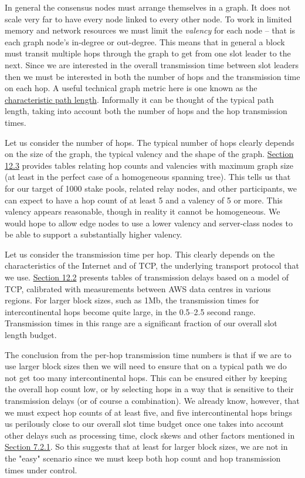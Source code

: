 \documentclass[11pt,a4paper]{article}
\begin{document}
In general the consensus nodes must arrange themselves in a graph. It
does not scale very far to have every node linked to every other node.
To work in limited memory and network resources we must limit the
\emph{valency} for each node -- that is each graph node's in-degree or
out-degree. This means that in general a block must transit multiple
hops through the graph to get from one slot leader to the next. Since we
are interested in the overall transmission time between slot leaders
then we must be interested in both the number of hops and the
transmission time on each hop. A useful technical graph metric here is
one known as the \protect\hyperlink{rm0n4bczhl67}{{characteristic path
length}}. Informally it can be thought of the typical path length,
taking into account both the number of hops and the hop transmission
times.

Let us consider the number of hops. The typical number of hops clearly
depends on the size of the graph, the typical valency and the shape of
the graph. \protect\hyperlink{model-of-network-scaling}{Section 12.3}
provides tables relating hop counts and valencies with maximum graph
size (at least in the perfect case of a homogeneous spanning tree). This
tells us that for our target of 1000 stake pools, related relay nodes,
and other participants, we can expect to have a hop count of at least 5
and a valency of 5 or more. This valency appears reasonable, though in
reality it cannot be homogeneous. We would hope to allow edge nodes to
use a lower valency and server-class nodes to be able to support a
substantially higher valency.

Let us consider the transmission time per hop. This clearly depends on
the characteristics of the Internet and of TCP, the underlying transport
protocol that we use.
\protect\hyperlink{tcp-rpc-response-behavior}{{Section 12.2}} presents
tables of transmission delays based on a model of TCP, calibrated with
measurements between AWS data centres in various regions. For larger
block sizes, such as 1Mb, the transmission times for intercontinental
hops become quite large, in the 0.5--2.5 second range. Transmission
times in this range are a significant fraction of our overall slot
length budget.

The conclusion from the per-hop transmission time numbers is that if we
are to use larger block sizes then we will need to ensure that on a
typical path we do not get too many intercontinental hops. This can be
ensured either by keeping the overall hop count low, or by selecting
hops in a way that is sensitive to their transmission delays (or of
course a combination). We already know, however, that we must expect hop
counts of at least five, and five intercontinental hops brings us
perilously close to our overall slot time budget once one takes into
account other delays such as processing time, clock skews and other
factors mentioned in \protect\hyperlink{timeliness-constraint}{{Section
7.2.1}}. So this suggests that at least for larger block sizes, we are
not in the "easy" scenario since we must keep both hop count and hop
transmission times under control.
\end{document}
